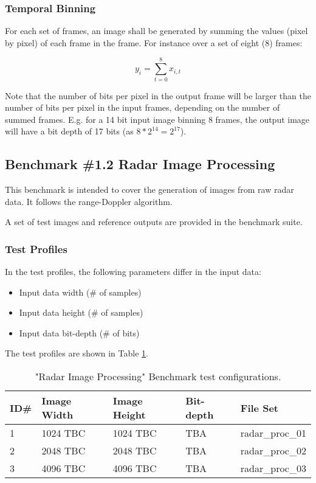 \subsubsection{Temporal Binning}
For each set of frames, an image shall be generated by summing the values (pixel by pixel) of each frame in the frame. For instance over a set of eight (8) frames:

\[y_{i} = \sum\limits_{t=0}^{8}x_{i,t}\]

Note that the number of bits per pixel in the output frame will be larger than the number of bits per pixel in the input frames, depending on the number of summed frames. E.g. for a 14 bit input image binning 8 frames, the output image will have a bit depth of 17 bits (as \(8*2^14 = 2^17\)).


\newpage
\subsection{Benchmark \#1.2 Radar Image Processing}

This benchmark is intended to cover the generation of images from raw radar data. It follows the range-Doppler algorithm.

A set of test images and reference outputs are provided in the benchmark suite. 

\subsubsection{Test Profiles}

In the test profiles, the following parameters differ in the input data:

\begin{itemize}
    \item Input data width (\# of samples)
    \item Input data height (\# of samples)
    \item Input data bit-depth (\# of bits)
\end{itemize}

The test profiles are shown in Table \ref{tab:bm1_2_tests}.


\begin{table}[!h]
    \begin{tabular}{|l|l|l|l|l|}
        \hline
        ID\#        & Image Width   & Image Height  & Bit-depth     & File Set    \\
        \hline
        1	        & 1024 TBC      & 1024 TBC      & TBA           & radar\_proc\_01 \\
        \hline
        2	        & 2048 TBC      & 2048 TBC      & TBA           & radar\_proc\_02 \\
        \hline
        3	        & 4096 TBC      & 4096 TBC      & TBA           & radar\_proc\_03 \\
        \hline
    \end{tabular}
    \caption{"Radar Image Processing" Benchmark test configurations.}
    \label{tab:bm1_2_tests}
\end{table}

